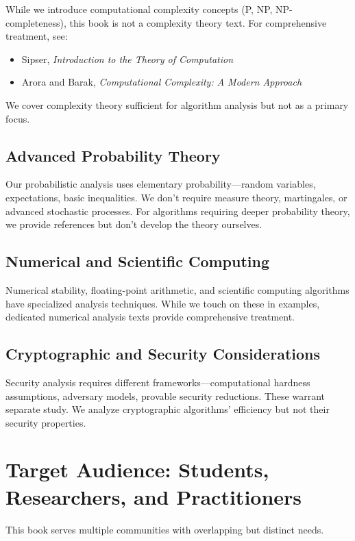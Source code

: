 While we introduce computational complexity concepts (P, NP, NP-completeness), this book is not a complexity theory text. For comprehensive treatment, see:
\begin{itemize}
    \item Sipser, \textit{Introduction to the Theory of Computation}
    \item Arora and Barak, \textit{Computational Complexity: A Modern Approach}
\end{itemize}
We cover complexity theory sufficient for algorithm analysis but not as a primary focus.

\subsection{Advanced Probability Theory}

Our probabilistic analysis uses elementary probability—random variables, expectations, basic inequalities. We don't require measure theory, martingales, or advanced stochastic processes. For algorithms requiring deeper probability theory, we provide references but don't develop the theory ourselves.

\subsection{Numerical and Scientific Computing}

Numerical stability, floating-point arithmetic, and scientific computing algorithms have specialized analysis techniques. While we touch on these in examples, dedicated numerical analysis texts provide comprehensive treatment.

\subsection{Cryptographic and Security Considerations}

Security analysis requires different frameworks—computational hardness assumptions, adversary models, provable security reductions. These warrant separate study. We analyze cryptographic algorithms' efficiency but not their security properties.

\section{Target Audience: Students, Researchers, and Practitioners}

This book serves multiple communities with overlapping but distinct needs.

